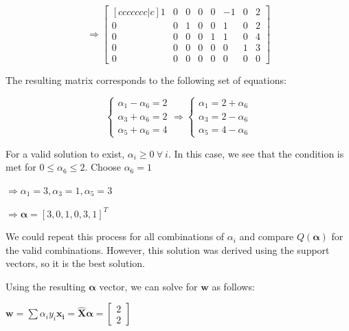 \documentclass[fleqn]{article}
\begin{document}
\begin{enumerate}
\begin{enumerate}
		\begin{equation*}
			\Rightarrow \begin{bmatrix}[ccccccc|c]
				1 & 0 & 0 & 0 & 0 & -1 & 0 & 2 \\
     			0 & 0 & 1 & 0 & 0 &  1 & 0 & 2 \\
               	0 & 0 & 0 & 0 & 1 &  1 & 0 & 4 \\
     			0 & 0 & 0 & 0 & 0 &  0 & 1 & 3 \\
     			0 & 0 & 0 & 0 & 0 &  0 & 0 & 0
			\end{bmatrix}
		\end{equation*}
		
		The resulting matrix corresponds to the following set of equations:
		
		\begin{equation*}
			\begin{cases}
				\alpha_1 - \alpha_6 = 2 \\
				\alpha_3 + \alpha_6 = 2 \\
				\alpha_5 + \alpha_6 = 4
			\end{cases} \Rightarrow \begin{cases}
				\alpha_1 = 2 + \alpha_6 \\
				\alpha_3 = 2 - \alpha_6 \\
				\alpha_5 = 4 - \alpha_6
			\end{cases}
		\end{equation*}
		
		For a valid solution to exist, $\alpha_i \geq 0\ \forall\ i$. In this case, we see that the condition is met for $0 \leq \alpha_6 \leq 2$. Choose $\alpha_6 = 1$
		
		$\Rightarrow \alpha_1 = 3, \alpha_3 = 1, \alpha_5 = 3$
		
		$\Rightarrow\boldsymbol{\alpha} = [3,0,1,0,3,1]^T$
		
		We could repeat this process for all combinations of $\alpha_i$ and compare $Q(\boldsymbol{\alpha})$ for the valid combinations. However, this solution was derived using the support vectors, so it is the best solution.
		
		Using the resulting $\boldsymbol{\alpha}$ vector, we can solve for $\mathbf{w}$ as follows:
		
		$\mathbf{w} = \sum{\alpha_iy_i\mathbf{x_i}} = \mathbf{\hat{X}}\boldsymbol{\alpha} = \begin{bmatrix} 2 \\ 2 \end{bmatrix}$
		

\end{enumerate}
\end{enumerate}
\end{document}

